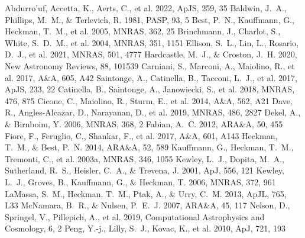 \documentclass[twocolumn]{aastex631}
\begin{document}

\begin{thebibliography}{}
 Abdurro'uf, Accetta, K., Aerts, C., et al. 2022, ApJS, 259, 35
 Baldwin, J.~A., Phillips, M.~M., \& Terlevich, R. 1981, PASP, 93, 5
 Best, P.~N., Kauffmann, G., Heckman, T.~M., et al. 2005, MNRAS, 362, 25
 Brinchmann, J., Charlot, S., White, S.~D.~M., et al. 2004, MNRAS, 351, 1151
 Ellison, S.~L., Lin, L., Rosario, D.~J., et al. 2021, MNRAS, 501, 4777
 Hardcastle, M.~J., \& Croston, J.~H. 2020, New Astronomy Reviews, 88, 101539
 Carniani, S., Marconi, A., Maiolino, R., et al. 2017, A\&A, 605, A42
 Saintonge, A., Catinella, B., Tacconi, L.~J., et al. 2017, ApJS, 233, 22
 Catinella, B., Saintonge, A., Janowiecki, S., et al. 2018, MNRAS, 476, 875
 Cicone, C., Maiolino, R., Sturm, E., et al. 2014, A\&A, 562, A21
 Dave, R., Angles-Alcazar, D., Narayanan, D., et al. 2019, MNRAS, 486, 2827
 Dekel, A., \& Birnboim, Y. 2006, MNRAS, 368, 2
 Fabian, A.~C. 2012, ARA\&A, 50, 455
 Fiore, F., Feruglio, C., Shankar, F., et al. 2017, A\&A, 601, A143
 Heckman, T.~M., \& Best, P.~N. 2014, ARA\&A, 52, 589
 Kauffmann, G., Heckman, T.~M., Tremonti, C., et al. 2003a, MNRAS, 346, 1055
 Kewley, L.~J., Dopita, M.~A., Sutherland, R.~S., Heisler, C.~A., \& Trevena, J. 2001, ApJ, 556, 121
 Kewley, L.~J., Groves, B., Kauffmann, G., \& Heckman, T. 2006, MNRAS, 372, 961
 LaMassa, S.~M., Heckman, T.~M., Ptak, A., \& Urry, C.~M. 2013, ApJL, 765, L33
 McNamara, B.~R., \& Nulsen, P.~E.~J. 2007, ARA\&A, 45, 117
 Nelson, D., Springel, V., Pillepich, A., et al. 2019, Computational Astrophysics and Cosmology, 6, 2
 Peng, Y.-j., Lilly, S.~J., Kovac, K., et al. 2010, ApJ, 721, 193

\end{thebibliography}
\end{document}
